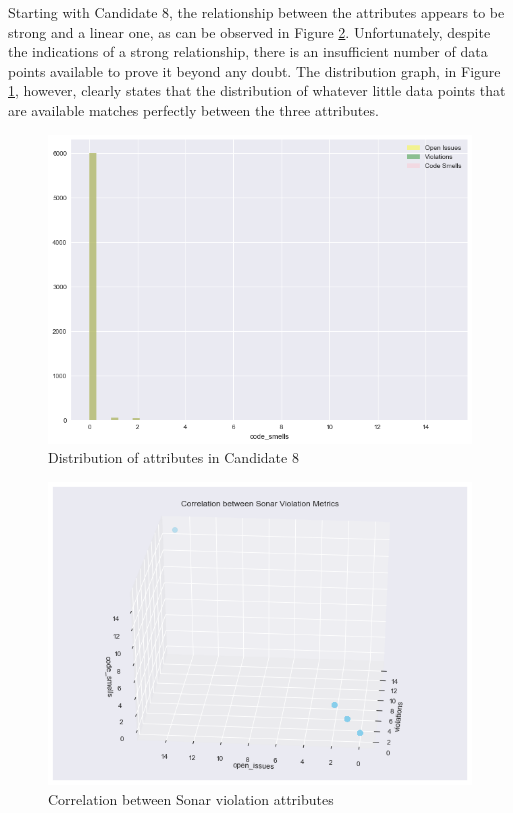 \begin{enumerate}
Starting with Candidate 8, the relationship between the attributes appears to be strong and a linear one, as can be observed in Figure \ref{fig:3d:candidate8-relationship}. Unfortunately, despite the indications of a strong relationship, there is an insufficient number of data points available to prove it beyond any doubt. The distribution graph, in Figure \ref{fig:candidate8-distribution}, however, clearly states that the distribution of whatever little data points that are available matches perfectly between the three attributes.

\begin{figure}
    \centering
    \includegraphics[scale=0.6]{Figures/correlation/Attribute_Distribution_in_Candidate_8.png}
    \caption{Distribution of attributes in Candidate 8}
    \label{fig:candidate8-distribution}
\end{figure}

\begin{figure}[!h]
    \centering
    \includegraphics[scale=0.6]{Figures/three-d/Correlation_between_attributes_violations_open_issues_code_smells.png}
    \caption{Correlation between Sonar violation attributes}
    \label{fig:3d:candidate8-relationship}
\end{figure}


\end{enumerate}
